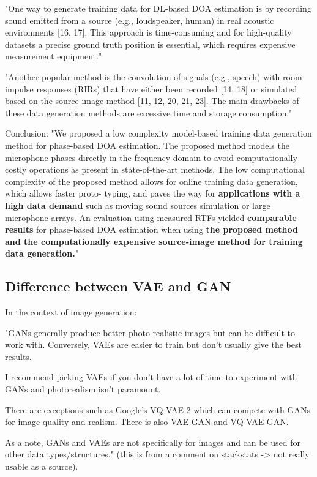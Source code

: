\documentclass{article}
\begin{document}
"One way to generate training data for DL-based DOA estimation is by recording sound emitted from a source (e.g., loudspeaker, human) in real acoustic environments [16, 17]. This approach is time-consuming and for high-quality datasets a precise ground truth position is essential, which requires expensive measurement equipment."

"Another popular method is the convolution of signals (e.g., speech) with room impulse responses (RIRs) that have either been recorded [14, 18] or simulated based on the source-image method [11, 12, 20, 21, 23]. The main drawbacks of these data generation methods are excessive time and storage consumption."


Conclusion: 
"We proposed a low complexity model-based training data
generation method for phase-based DOA estimation. The
proposed method models the microphone phases directly
in the frequency domain to avoid computationally costly
operations as present in state-of-the-art methods. The low
computational complexity of the proposed method allows for
online training data generation, which allows faster proto-
typing, and paves the way for \textbf{applications with a high data
demand} such as moving sound sources simulation or large
microphone arrays. An evaluation using measured RTFs
yielded \textbf{comparable results} for phase-based DOA estimation
when using \textbf{the proposed method and the computationally
expensive source-image method for training data generation.}"

\subsection{Difference between VAE and GAN}

In the context of image generation:

"GANs generally produce better photo-realistic images but can be difficult to work with. Conversely, VAEs are easier to train but don’t usually give the best results.

I recommend picking VAEs if you don’t have a lot of time to experiment with GANs and photorealism isn’t paramount.

There are exceptions such as Google’s VQ-VAE 2 which can compete with GANs for image quality and realism. There is also VAE-GAN and VQ-VAE-GAN.

As a note, GANs and VAEs are not specifically for images and can be used for other data types/structures." (this is from a comment on stackstats -> not really usable as a source).
\end{document}
